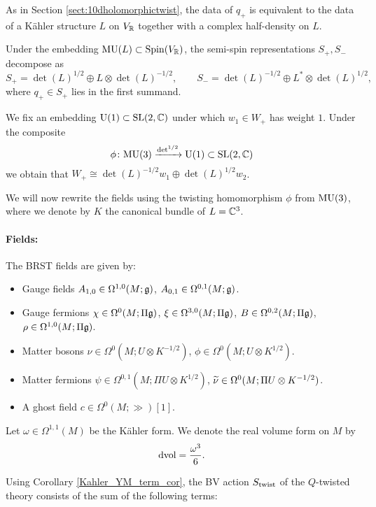 \documentclass[10pt, oneside]{article}
\begin{document}
As in Section \ref{sect:10dholomorphictwist}, the data of $q_+$ is equivalent to the data of a K\"ahler structure $L$ on $V_\mathbb R$ together with a complex half-density on $L$.

Under the embedding $\mathrm{MU}(L)\subset \mathrm{Spin}(V_\mathbb R)$, the semi-spin representations $S_+, S_-$ decompose as
\[S_+ = \det(L)^{1/2}\oplus L\otimes \det(L)^{-1/2},\qquad S_- = \det(L)^{-1/2} \oplus L^*\otimes \det(L)^{1/2},\]
where $q_+\in S_+$ lies in the first summand.

We fix an embedding $\mathrm{U}(1)\subset \mathrm{SL}(2, \mathbb C)$ under which $w_1\in W_+$ has weight $1$. Under the composite
\[\phi\colon\mathrm{MU}(3)\xrightarrow{\det^{1/2}}\mathrm{U}(1)\subset \mathrm{SL}(2, \mathbb C)\]
we obtain that $W_+\cong \det(L)^{-1/2} w_1\oplus \det(L)^{1/2} w_2$.

We will now rewrite the fields using the twisting homomorphism $\phi$ from $\mathrm{MU}(3)$, where we denote by $K$ the canonical bundle of $L=\mathbb C^3$.

\vspace{-10pt}
\paragraph{Fields:} The BRST fields are given by:
\begin{itemize}
\item Gauge fields $A_{1, 0} \in \Omega^{1, 0}(M; \mathfrak g)$, $A_{0, 1}\in\Omega^{0, 1}(M; \mathfrak g)$.
\item Gauge fermions $\chi\in\Omega^0(M; \Pi\mathfrak g)$, $\xi\in\Omega^{3, 0}(M; \Pi\mathfrak g)$, $B\in\Omega^{0, 2}(M; \Pi\mathfrak g)$, $\rho\in\Omega^{1, 0}(M; \Pi\mathfrak g)$.
\item Matter bosons $\nu\in\Omega^0(M; U\otimes K^{-1/2})$, $\phi\in\Omega^0(M; U\otimes K^{1/2})$.
\item Matter fermions $\psi\in \Omega^{0, 1}(M; \Pi U\otimes K^{1/2})$, $\widetilde{\nu}\in\Omega^0(M; \Pi U\otimes K^{-1/2})$.
\item A ghost field $c\in \Omega^0(M; \gg)[1]$.
\end{itemize}

Let $\omega\in\Omega^{1, 1}(M)$ be the K\"ahler form. We denote the real volume form on $M$ by
\[\operatorname{dvol} = \frac{\omega^3}{6}.\]

Using Corollary \ref{Kahler_YM_term_cor}, the BV action $S_{\mathrm{twist}}$ of the $Q$-twisted theory consists of the sum of the following terms:
\end{document}
